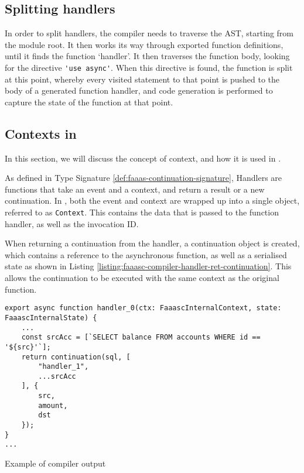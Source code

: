 \subsection{Splitting \faas{} handlers}
In order to split handlers, the \faaasc{} compiler needs to traverse the AST, starting from the module root. It then works its way through exported function definitions, until it finds the function `handler'. It then traverses the function body, looking for the directive \verb|'use async'|. When this directive is found, the function is split at this point, whereby every visited statement to that point is pushed to the body of a generated function handler, and code generation is performed to capture the state of the function at that point.

\subsection{Contexts in \faaasc{}}
In this section, we will discuss the concept of context, and how it is used in \faaasc{}.

As defined in Type Signature \ref{def:faaas-continuation-signature}, Handlers are functions that take an event and a context, and return a result or a new continuation. In \faaasc{}, both the event and context are wrapped up into a single object, referred to as \verb|Context|. This contains the data that is passed to the function handler, as well as the invocation ID.

When returning a continuation from the handler, a continuation object is created, which contains a reference to the asynchronous function, as well as a serialised state as shown in Listing \ref{listing:faaasc-compiler-handler-ret-continuation}. This allows the continuation to be executed with the same context as the original function.

\begin{listing}[H]
\begin{verbatim}
export async function handler_0(ctx: FaaascInternalContext, state: FaaascInternalState) {
    ...
    const srcAcc = [`SELECT balance FROM accounts WHERE id == '${src}'`];
    return continuation(sql, [
        "handler_1",
        ...srcAcc
    ], {
        src,
        amount,
        dst
    });
}
...
\end{verbatim}
\caption{Example of \faaasc{} compiler output}
\label{listing:faaasc-compiler-handler-ret-continuation}
\end{listing}

